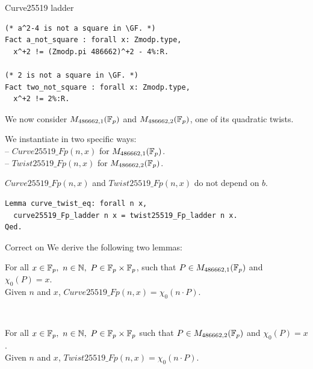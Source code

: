 \documentclass[8pt,aspectratio=169]{beamer}
\begin{document}
%
%
\begin{frame}[fragile]{Curve25519 ladder}
	\begin{lstlisting}[language=Coq, basicstyle=\normalsize]
(* a^2-4 is not a square in \GF. *)
Fact a_not_square : forall x: Zmodp.type,
  x^+2 != (Zmodp.pi 486662)^+2 - 4%:R.

(* 2 is not a square in \GF. *)
Fact two_not_square : forall x: Zmodp.type,
  x^+2 != 2%:R.
\end{lstlisting}

	We now consider $M_{486662,1}(\mathbb{F}_{p})$ and $M_{486662,2}(\mathbb{F}_{p})$, one of its quadratic twists.

	\begin{dfn}
		We instantiate  in two specific ways:\\
		-- $Curve25519\_Fp(n,x)$ for $M_{486662,1}(\mathbb{F}_{p})$.\\
		-- $Twist25519\_Fp(n,x)$ for $M_{486662,2}(\mathbb{F}_{p})$.
	\end{dfn}

	$Curve25519\_Fp(n,x)$ and $Twist25519\_Fp(n,x)$ do not depend on $b$.
	\begin{lstlisting}[language=Coq, basicstyle=\normalsize]
Lemma curve_twist_eq: forall n x,
  curve25519_Fp_ladder n x = twist25519_Fp_ladder n x.
Qed.
\end{lstlisting}
\end{frame}


%
%
\begin{frame}[fragile]{Correct on }
	We derive the following two lemmas:
	\begin{lemma}
		For all $x \in \mathbb{F}_{p},\ n \in \mathbb{N},\ P \in \mathbb{F}_{p} \times \mathbb{F}_{p}$,
		such that $P \in M_{486662,1}(\mathbb{F}_{p})$ and $\chi_0(P) = x$.\\
		Given $n$ and $x$, $Curve25519\_Fp(n,x) = \chi_0(n \cdot P)$.
	\end{lemma}
	~\\

	\begin{lemma}
		For all $x \in \mathbb{F}_{p},\ n \in \mathbb{N},\ P \in \mathbb{F}_{p} \times \mathbb{F}_{p}$
		such that $P \in M_{486662,2}(\mathbb{F}_{p})$ and $\chi_0(P) = x$.\\
		Given $n$ and $x$, $Twist25519\_Fp(n,x) = \chi_0(n \cdot P)$.
	\end{lemma}
\end{frame}
\end{document}
